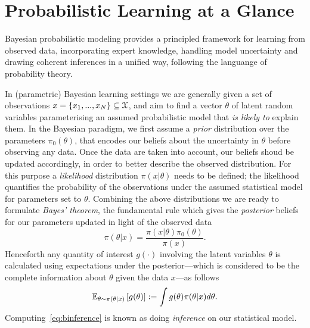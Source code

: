 \section{Probabilistic Learning at  a Glance}
\label{sec:b-bayesian-inference}

Bayesian probabilistic modeling provides a principled framework for  learning from observed data, incorporating expert knowledge, handling model uncertainty and drawing coherent inferences in a unified way, following the languange of probability theory.

In (parametric) Bayesian learning settings we are generally given a set of observations $x = \{x_1,...,x_N\} \subseteq \mathcal{X}$, and aim to find a vector $\theta $ of latent random variables parameterising an assumed probabilistic model that \emph{is likely to} explain them. In the Bayesian paradigm, we first assume a \emph{prior} distribution over the parameters $\pi_0(\theta)$, that encodes our beliefs about the uncertainty in $\theta$ before observing any data. Once the data are taken into account, our beliefs shoud be updated accordingly, in order to better describe the observed distribution. For this purpose a \emph{likelihood} distribution $\pi(x|\theta)$ needs to be defined; the likelihood quantifies the probability of the observations under the assumed statistical model for parameters set to $\theta$. Combining the above distributions we are ready to formulate \emph{Bayes' theorem}, the fundamental rule which gives the \emph{posterior} beliefs for our parameters updated in light of the observed data
\[
\pi(\theta|x) = \frac{\pi(x|\theta)\pi_0(\theta)}{\pi(x)}.
\label{eq:bbayes-rule}
\] 
Henceforth any quantity of interest $g(\cdot)$ involving the latent variables $\theta$ is calculated using expectations under the posterior---which is considered to be the complete information about $\theta$ given the data $x$---as follows
\[
\mathbb{E}_{\theta \sim \pi(\theta|x)}\left[g(\theta)\right] := \int g(\theta) \pi(\theta|x) d\theta.
\label{eq:binference}
\]
Computing~\cref{eq:binference} is known as doing \emph{inference} on our statistical model.

